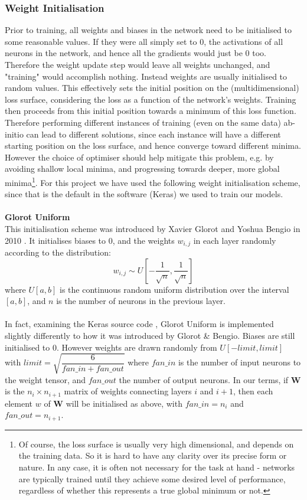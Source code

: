 \documentclass[11pt]{article} %
\theoremstyle{plain}
\theoremstyle{definition}
\begin{document}
\subsubsection{Weight Initialisation}
Prior to training, all weights and biases in the network need to be initialised to some reasonable values. If they were all simply set to 0, the activations of all neurons in the network, and hence all the gradients would just be 0 too. Therefore the weight update step would leave all weights unchanged, and "training" would accomplish nothing. Instead weights are usually initialised to random values. This effectively sets the initial position on the (multidimensional) loss surface, considering the loss as a function of the network's weights. Training then proceeds from this initial position towards a minimum of this loss function. Therefore performing different instances of training (even on the same data) ab-initio can lead to different solutions, since each instance will have a different starting position on the loss surface, and hence converge toward different minima. However the choice of optimiser should help mitigate this problem, e.g. by avoiding shallow local minima, and progressing towards deeper, more global minima\footnote{Of course, the loss surface is usually very high dimensional, and depends on the training data. So it is hard to have any clarity over its precise form or nature. In any case, it is often not necessary for the task at hand - networks are typically trained until they achieve some desired level of performance, regardless of whether this represents a true global minimum or not.}. For this project we have used the following weight initialisation scheme, since that is the default in the software (Keras) we used to train our models.
\\
\\
\noindent
\textbf{Glorot Uniform}
\\
\noindent
This initialisation scheme was introduced by Xavier Glorot and Yoshua Bengio in 2010 \cite{glorot_uniform}. It initialises biases to 0, and the weights \(w_{i,j}\) in each layer randomly according to the distribution:
\[ w_{i,j} \sim U[-\dfrac{1}{\sqrt{n}}, \dfrac{1}{\sqrt{n}}] \]
where \(U[a,b]\) is the continuous random uniform distribution over the interval \([a,b]\), and \(n\) is the number of neurons in the previous layer.
\\
\\
\noindent
In fact, examining the Keras source code \cite{keras_source}, Glorot Uniform is implemented slightly differently to how it was introduced by Glorot \& Bengio. Biases are still initialised to 0. However weights are drawn randomly from \(U[-limit,limit]\) with \(limit = \sqrt{\dfrac{6}{fan\_in + fan\_out}}\) where \(fan\_in\) is the number of input neurons to the weight tensor, and \(fan\_out\) the number of output neurons. In our terms, if \(\mathbf{W}\) is the \(n_i \times n_{i+1}\) matrix of weights connecting layers \(i\) and \(i+1\), then each element \(w\) of \(\mathbf{W}\) will be initialised as above, with \(fan\_in = n_i\) and \(fan\_out = n_{i+1}\).  
\end{document}
